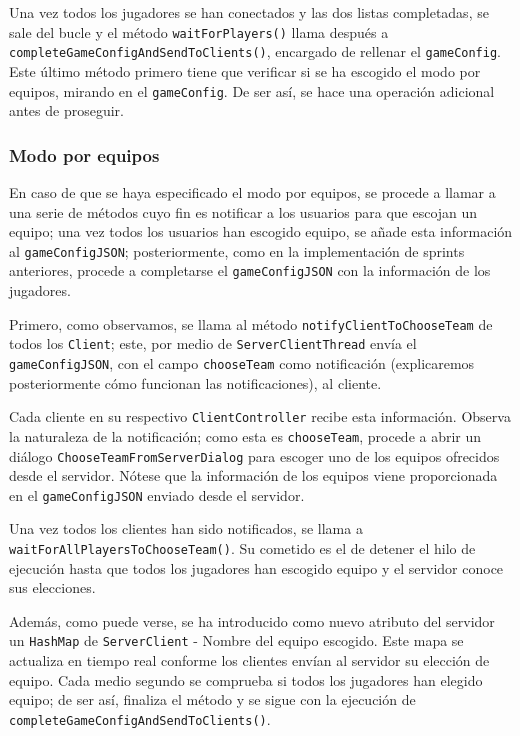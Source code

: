 \documentclass[../DocumentoOficial.tex]{subfiles}
\begin{document}
Una vez todos los jugadores se han conectados y las dos listas completadas, se sale del bucle y el método \texttt{waitForPlayers()} llama después a \texttt{completeGameConfigAndSendToClients()}, encargado de rellenar el \texttt{gameConfig}. Este último método primero tiene que verificar si se ha escogido el modo por equipos, mirando en el \texttt{gameConfig}. De ser así, se hace una operación adicional antes de proseguir.

\subsubsection{Modo por equipos}

En caso de que se haya especificado el modo por equipos, se procede a llamar a una serie de métodos cuyo fin es notificar a los usuarios para que escojan un equipo; una vez todos los usuarios han escogido equipo, se añade esta información al \texttt{gameConfigJSON}; posteriormente, como en la implementación de sprints anteriores, procede a completarse el \texttt{gameConfigJSON} con la información de los jugadores.

Primero, como observamos, se llama al método \texttt{notifyClientToChooseTeam} de todos los \texttt{Client}; este, por medio de \texttt{ServerClientThread} envía el \texttt{gameConfigJSON}, con el campo \texttt{chooseTeam} como notificación (explicaremos posteriormente cómo funcionan las notificaciones), al cliente.

Cada cliente en su respectivo \texttt{ClientController} recibe esta información. Observa la naturaleza de la notificación; como esta es \texttt{chooseTeam}, procede a abrir un diálogo \texttt{ChooseTeamFromServerDialog} para escoger uno de los equipos ofrecidos desde el servidor. Nótese que la información de los equipos viene proporcionada en el \texttt{gameConfigJSON} enviado desde el servidor.

Una vez todos los clientes han sido notificados, se llama a \texttt{waitForAllPlayersToChooseTeam()}. Su cometido es el de detener el hilo de ejecución hasta que todos los jugadores han escogido equipo y el servidor conoce sus elecciones.

Además, como puede verse, se ha introducido como nuevo atributo del servidor un \texttt{HashMap} de \texttt{ServerClient} - Nombre del equipo escogido. Este mapa se actualiza en tiempo real conforme los clientes envían al servidor su elección de equipo. Cada medio segundo se comprueba si todos los jugadores han elegido equipo; de ser así, finaliza el método y se sigue con la ejecución de \texttt{completeGameConfigAndSendToClients()}.
\end{document}
